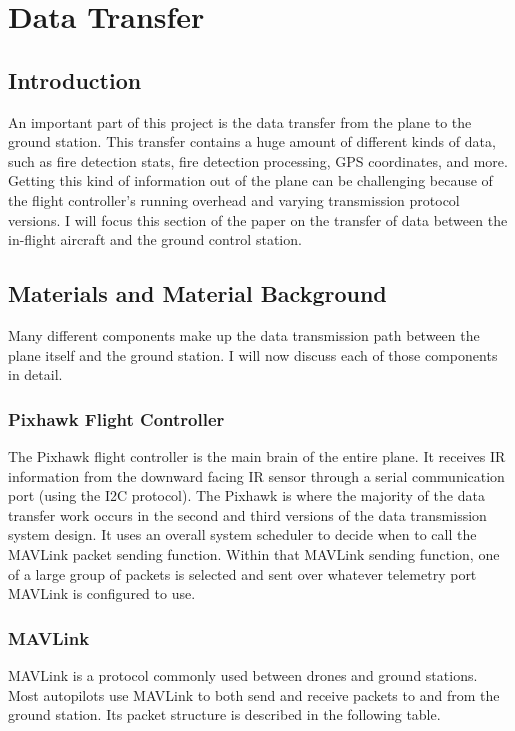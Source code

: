\documentclass[12pt,journal,compsoc]{IEEEtran}
\begin{document}
\section{Data Transfer}
\subsection{Introduction}
An important part of this project is the data transfer from the plane to the ground station. This transfer contains a huge amount of different kinds of data, such as fire detection stats, fire detection processing, GPS coordinates, and more. Getting this kind of information out of the plane can be challenging because of the flight controller's running overhead and varying transmission protocol versions. I will focus this section of the paper on the transfer of data between the in-flight aircraft and the ground control station.

\subsection{Materials and Material Background}
Many different components make up the data transmission path between the plane itself and the ground station. I will now discuss each of those components in detail.

\subsubsection{Pixhawk Flight Controller}
The Pixhawk flight controller is the main brain of the entire plane. It receives IR information from the downward facing IR sensor through a serial communication port (using the I2C protocol). The Pixhawk is where the majority of the data transfer work occurs in the second and third versions of the data transmission system design. It uses an overall system scheduler to decide when to call the MAVLink packet sending function. Within that MAVLink sending function, one of a large group of packets is selected and sent over whatever telemetry port MAVLink is configured to use.

\subsubsection{MAVLink}
MAVLink is a protocol commonly used between drones and ground stations. Most autopilots use MAVLink to both send and receive packets to and from the ground station. Its packet structure is described in the following table.
\end{document}
